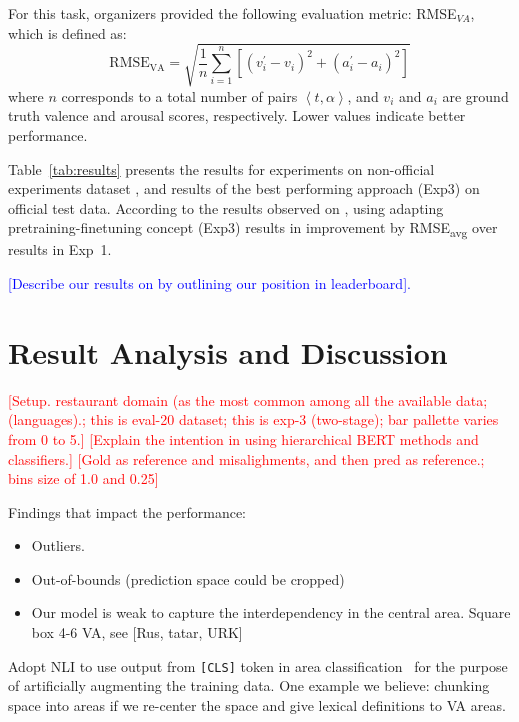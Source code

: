 \documentclass[11pt]{article}
\begin{document}


For this task, organizers provided the following evaluation metric: RMSE$_{VA}$, which is defined as:
{\small
\begin{equation*}
    \text{RMSE}_{\text{VA}} = \sqrt{\frac{1}{n}\sum_{i=1}^{n} \left[(v_{i}^{'} - v_{i})^2 + (a_{i}^{'} - a_{i})^2\right]}
\end{equation*}
}%
where $n$ corresponds to a total number of pairs $\left<t, \alpha\right>$, and 
$v_{i}$ and $a_{i}$ are ground truth valence and arousal scores, respectively. Lower values indicate better performance.

Table~\ref{tab:results} presents the results for experiments on non-official experiments dataset \dimabsaTrainEval{}, and results of the best performing approach (Exp3) on official test \dimabsaTest{} data.
According to the results observed on \dimabsaTrainEval{}, using adapting pretraining-finetuning concept (Exp3) results in \improvement{} improvement by RMSE\textsubscript{avg} over results in Exp~1.

\textcolor{blue}{[Describe our results on \dimabsaTest{} by outlining our position in leaderboard].}

\section{Result Analysis and Discussion}
\label{sec:result-analysis-and-discussion}

\textcolor{red}{[Setup. restaurant domain (as the most common among all the available data; (languages).; this is eval-20 dataset; this is exp-3 (two-stage); bar pallette varies from 0 to 5.]} \textcolor{red}{[Explain the intention in using hierarchical BERT methods and classifiers.]}
\textcolor{red}{[Gold as reference and misalighments, and then pred as reference.; bins size of 1.0 and 0.25]}

Findings that impact the performance:
\begin{itemize}
    \item Outliers.
    \item Out-of-bounds (prediction space could be cropped)
    \item Our model is weak to capture the interdependency in the central area.
Square box 4-6 VA, see [Rus, tatar, URK]
\end{itemize}

Adopt NLI to use output from \texttt{[CLS]} token in area classification~\cite{sun2019utilizing} for the purpose of artificially augmenting the training data. One example we believe: chunking space into areas 
if we re-center the space and give lexical definitions to VA areas.
\end{document}
